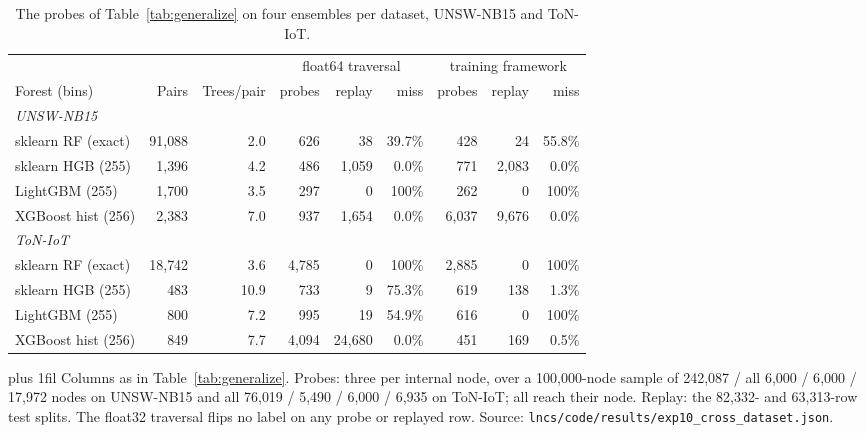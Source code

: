 \documentclass[runningheads]{llncs}
\newcommand{\tabnote}[1]{%
  \vspace{4pt}\par\noindent
  \begin{minipage}{\textwidth}%
    \footnotesize\parindent=0pt\leftskip=0pt\rightskip=0pt\parfillskip=0pt plus 1fil\relax
    #1%
  \end{minipage}}
\begin{document}
\begin{table}[htbp]
  \caption{The probes of Table~\ref{tab:generalize} on four ensembles per dataset, UNSW-NB15 and ToN-IoT.}
  \label{tab:datasets}
  \centering
  \footnotesize
  \setlength{\tabcolsep}{3pt}
  \begin{tabular}{l r r r r r r r r}
    \toprule
     & & & \multicolumn{3}{c}{float64 traversal} & \multicolumn{3}{c}{training framework} \\
    \cmidrule(lr){4-6}\cmidrule(lr){7-9}
    Forest (bins) & Pairs & Trees/pair & probes & replay & miss & probes & replay & miss \\
    \midrule
    \multicolumn{9}{l}{\emph{UNSW-NB15}} \\
    sklearn RF (exact)     & 91{,}088 & 2.0  & 626     & 38       & 39.7\% & 428     & 24      & 55.8\% \\
    sklearn HGB (255)      & 1{,}396  & 4.2  & 486     & 1{,}059  & 0.0\%  & 771     & 2{,}083 & 0.0\%  \\
    LightGBM (255)         & 1{,}700  & 3.5  & 297     & 0        & 100\%  & 262     & 0       & 100\%  \\
    XGBoost hist (256)     & 2{,}383  & 7.0  & 937     & 1{,}654  & 0.0\%  & 6{,}037 & 9{,}676 & 0.0\%  \\
    \multicolumn{9}{l}{\emph{ToN-IoT}} \\
    sklearn RF (exact)     & 18{,}742 & 3.6  & 4{,}785 & 0        & 100\%  & 2{,}885 & 0       & 100\%  \\
    sklearn HGB (255)      & 483      & 10.9 & 733     & 9        & 75.3\% & 619     & 138     & 1.3\%  \\
    LightGBM (255)         & 800      & 7.2  & 995     & 19       & 54.9\% & 616     & 0       & 100\%  \\
    XGBoost hist (256)     & 849      & 7.7  & 4{,}094 & 24{,}680 & 0.0\%  & 451     & 169     & 0.5\%  \\
    \bottomrule
  \end{tabular}
  \tabnote{Columns as in Table~\ref{tab:generalize}. Probes: three per internal node, over a 100{,}000-node sample of 242{,}087 / all 6{,}000 / 6{,}000 / 17{,}972 nodes on UNSW-NB15 and all 76{,}019 / 5{,}490 / 6{,}000 / 6{,}935 on ToN-IoT; all reach their node. Replay: the 82{,}332- and 63{,}313-row test splits. The float32 traversal flips no label on any probe or replayed row. Source: \texttt{lncs/code/results/exp10\_cross\_dataset.json}.}
\end{table}
\end{document}
